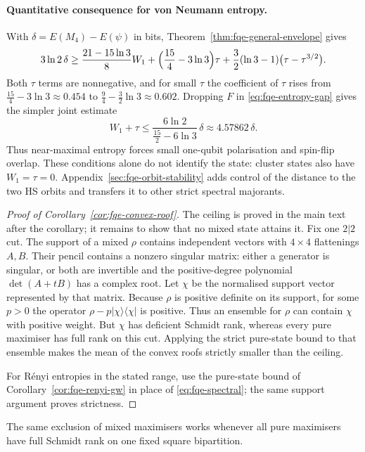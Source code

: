 \paragraph{Quantitative consequence for von Neumann entropy.} With \(\delta=E(M_4)-E(\psi)\) in bits,
Theorem~\ref{thm:fqe-general-envelope} gives \[
3\ln2\,\delta\ge
\frac{21-15\ln3}{8}W_1
+\Bigl(\frac{15}4-3\ln3\Bigr)\tau+\frac32(\ln3-1)\bigl(\tau-\tau^{3/2}\bigr).
\] Both \(\tau\) terms are nonnegative, and for small \(\tau\) the
coefficient of \(\tau\) rises from \(\frac{15}4-3\ln3\approx0.454\) to \(\frac94-\frac32\ln3\approx0.602\). Dropping $F$ in \eqref{eq:fqe-entropy-gap} gives the simpler joint estimate \[
W_1+\tau
\le\frac{6\ln2}{\tfrac{15}{2}-6\ln3}\,\delta
\approx4.57862\,\delta.
\] Thus near-maximal entropy forces small one-qubit polarisation and spin-flip overlap.
These conditions alone do not identify the state: cluster states also have $W_1=\tau=0$.
Appendix~\ref{sec:fqe-orbit-stability} adds control of the distance to the two HS orbits and transfers it to
other strict spectral majorants.

\begin{proof}[Proof of Corollary~\ref{cor:fqe-convex-roof}]
The ceiling is proved in the main text after the corollary; it remains to show that no mixed state attains it. Fix one \(2|2\) cut. The support of a
mixed \(\rho\) contains independent vectors with \(4\times4\) flattenings
\(A,B\). Their pencil contains a nonzero singular matrix: either a
generator is singular, or both are invertible and the positive-degree
polynomial \(\det(A+tB)\) has a complex root. Let \(\chi\) be the
normalised support vector represented by that matrix. Because \(\rho\)
is positive definite on its support, for some \(p>0\) the operator
\(\rho-p|\chi\rangle\langle\chi|\) is positive. Thus an ensemble for
\(\rho\) can contain \(\chi\) with positive weight. But \(\chi\) has
deficient Schmidt rank, whereas every pure maximiser has full rank on
this cut. Applying the strict pure-state bound to that ensemble makes
the mean of the convex roofs strictly smaller than the ceiling.

For R\'enyi entropies in the stated range, use the pure-state bound of
Corollary~\ref{cor:fqe-renyi-gw} in place of
\eqref{eq:fqe-spectral}; the same support argument proves strictness.
\end{proof}

The same exclusion of mixed maximisers works whenever all pure maximisers have full Schmidt rank on
one fixed square bipartition.
